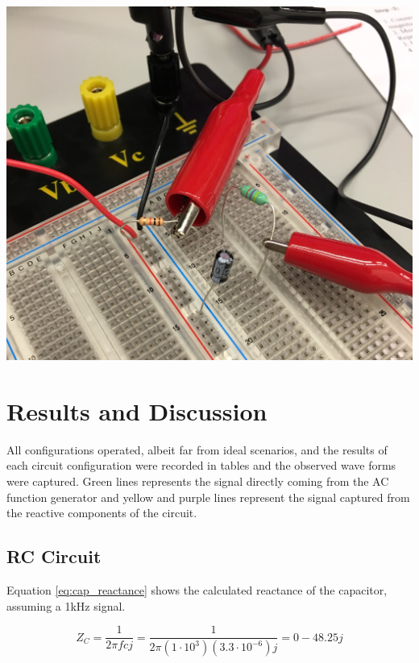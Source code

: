 \documentclass[journal]{IEEEtran}
\begin{document}
\\
\medskip
\medskip

\begingroup
    \centering
    \medskip
    \includegraphics[width=\columnwidth]{images/lab8_circ3.jpg}
    \label{fig:circ3image}
    \medskip
\endgroup

\pagebreak

\section{Results and Discussion}

\noindent All configurations operated, albeit far from ideal scenarios, and the results of each circuit configuration were recorded in tables and the observed wave forms were captured. Green lines represents the signal directly coming from the AC function generator and yellow and purple lines represent the signal captured from the reactive components of the circuit.

\subsection{RC Circuit}
\noindent Equation \ref{eq:cap_reactance} shows the calculated reactance of the capacitor, assuming a 1kHz signal.

\begin{equation}
Z_{C} = \frac{1}{2\pi fcj} = \frac{1}{2\pi(1\cdot10^3)(3.3\cdot10^{-6})j} = 0 - 48.25j
\label{eq:cap_reactance}
\end{equation}
\\
\end{document}
